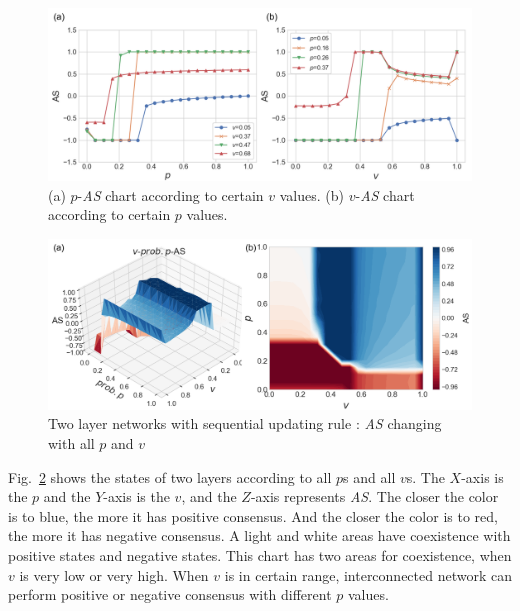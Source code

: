 \documentclass[review]{elsarticle}
\begin{document}
\begin{figure}[!htb]
	\centering
	\includegraphics[width=\hsize]{AS_2d.png}
	\caption{(a) $p$-\textit{AS} chart according to certain $v$ values. (b) $v$-\textit{AS} chart according to certain $p$ values.}
	\label{AS_2d}
\end{figure}

\begin{figure}[!htb]
	\centering
	\includegraphics[width=\hsize]{p_v_AS_3d.png}
	\caption{Two layer networks with sequential updating rule : \textit{AS} changing with all $p$ and $v$}
	\label{p_v_AS_3d}
\end{figure}


Fig.~\ref{p_v_AS_3d} shows the states of two layers according to all $p$s and all $v$s. The $X$-axis is the $p$ and the $Y$-axis is the $v$, and the $Z$-axis represents \textit{AS}. The closer the color is to blue, the more it has positive consensus. And the closer the color is to red, the more it has negative consensus. A light and white areas have coexistence with positive states and negative states. This chart has two areas for coexistence, when $v$ is very low or very high. When $v$ is in certain range, interconnected network can perform positive or negative consensus with different $p$ values. 
\end{document}
